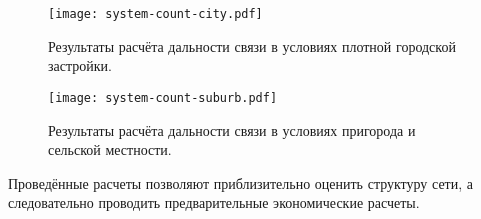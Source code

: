 \begin{figure}[H]
	\centering
	\texttt{[image: system-count-city.pdf]}
	\caption{Результаты расчёта дальности связи в условиях плотной городской застройки.}
	\label{fig:system-count-city}
\end{figure}

\begin{figure}[H]
\centering
\texttt{[image: system-count-suburb.pdf]}
\caption{Результаты расчёта дальности связи в условиях пригорода и сельской местности.}
\label{fig:system-count-suburb}
\end{figure}

Проведённые расчеты позволяют приблизительно оценить структуру сети, а следовательно проводить предварительные экономические расчеты.




